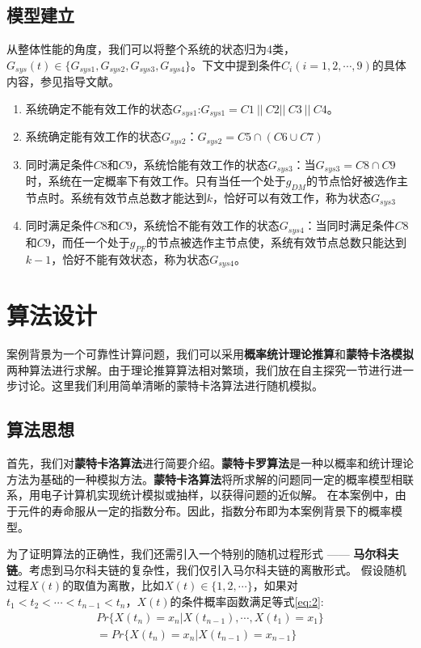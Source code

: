 \documentclass[10.5pt,twocolumn]{jbuaa}
\begin{document}
\subsection{模型建立}
从整体性能的角度，我们可以将整个系统的状态归为4类，$G_{sys}(t)\in \{G_{sys1}, G_{sys2}, G_{sys3}, G_{sys4}\}$。下文中提到条件$C_i (i = 1, 2, \cdots , 9)$的具体内容，参见指导文献\cite{cite1}。
\begin{enumerate}
	\item 系统确定不能有效工作的状态$G_{sys1}$:\quad $G_{sys1} = C1\ ||\ C2 ||\ C3 \ || \ C4$。
	\item 系统确定能有效工作的状态$G_{sys2}$：\quad $G_{sys2} = C5 \cap (C6 \cup C7)$
	\item 同时满足条件$C8$和$C9$，系统恰能有效工作的状态$G_{sys3}$：当$G_{sys3} = C8 \cap C9$时，系统在一定概率下有效工作。只有当任一个处于$g_{DM}$的节点恰好被选作主节点时。系统有效节点总数才能达到$k$，恰好可以有效工作，称为状态$G_{sys3}$
	\item 同时满足条件$C8$和$C9$，系统恰不能有效工作的状态$G_{sys4}$：当同时满足条件$C8$和$C9$，而任一个处于$g_{PF}$的节点被选作主节点使，系统有效节点总数只能达到$k - 1$，恰好不能有效状态，称为状态$G_{sys4}$。
\end{enumerate}
\section{算法设计}
案例背景为一个可靠性计算问题，我们可以采用\textbf{概率统计理论推算}和\textbf{蒙特卡洛模拟}两种算法进行求解。由于理论推算算法相对繁琐，我们放在自主探究一节进行进一步讨论。这里我们利用简单清晰的蒙特卡洛算法进行随机模拟。
\subsection{算法思想}
首先，我们对\textbf{蒙特卡洛算法}进行简要介绍。\textbf{蒙特卡罗算法}是一种以概率和统计理论方法为基础的一种模拟方法。\textbf{蒙特卡洛算法}将所求解的问题同一定的概率模型相联系，用电子计算机实现统计模拟或抽样，以获得问题的近似解\cite{cite2}。 在本案例中，由于元件的寿命服从一定的指数分布。因此，指数分布即为本案例背景下的概率模型。

为了证明算法的正确性，我们还需引入一个特别的随机过程形式 —— \textbf{马尔科夫链}。考虑到马尔科夫链的复杂性，我们仅引入马尔科夫链的离散形式\cite{cite4}。 假设随机过程$X(t)$的取值为离散，比如$X(t) \in \{1, 2, \cdots \}$，如果对$t_1 < t_2 < \cdots < t_{n - 1} < t_{n}$，$X(t)$的条件概率函数满足等式\eqref{eq:2}:
\begin{equation} \label{eq:2}
\begin{split}
	Pr
	\{X(t_n) = x_n  | X(t_{n - 1}), \cdots,  X(t_1) = x_1\}
	\\
	  = Pr\{X(t_n) = x_n | X(t_{n - 1}) = x_{n - 1}\}
\end{split}
\end{equation}
\end{document}
